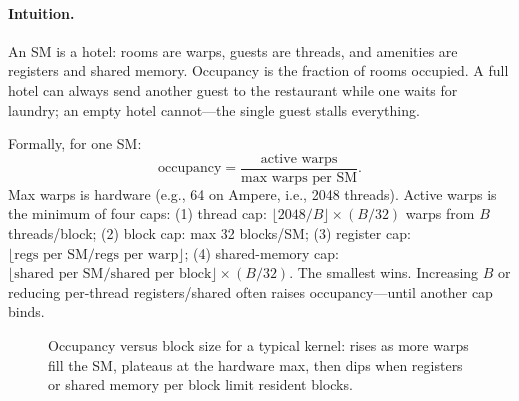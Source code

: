 \paragraph{Intuition.} An SM is a hotel: rooms are warps, guests are threads, and amenities are registers and shared memory. Occupancy is the fraction of rooms occupied. A full hotel can always send another guest to the restaurant while one waits for laundry; an empty hotel cannot---the single guest stalls everything.

Formally, for one SM:
\begin{equation}
\text{occupancy} = \frac{\text{active warps}}{\text{max warps per SM}}.
\end{equation}
Max warps is hardware (e.g., 64 on Ampere, i.e., 2048 threads). Active warps is the minimum of four caps: (1) thread cap: $\lfloor2048/B\rfloor\times(B/32)$ warps from $B$ threads/block; (2) block cap: max 32 blocks/SM; (3) register cap: $\lfloor\text{regs per SM}/\text{regs per warp}\rfloor$; (4) shared-memory cap: $\lfloor\text{shared per SM}/\text{shared per block}\rfloor\times(B/32)$. The smallest wins. Increasing $B$ or reducing per-thread registers/shared often raises occupancy---until another cap binds.

\begin{figure}[h]\centering
{}
\caption{Occupancy versus block size for a typical kernel: rises as more warps fill the SM, plateaus at the hardware max, then dips when registers or shared memory per block limit resident blocks.}
\label{fig:occupancy-curve}
\end{figure}


